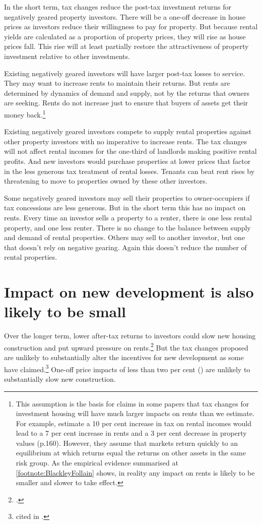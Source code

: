 In the short term, tax changes reduce the post-tax investment returns for negatively geared property investors. There will be a one-off decrease in house prices as investors reduce their willingness to pay for property. But because rental yields are calculated as a proportion of property prices, they will rise as house prices fall. This rise will at least partially restore the attractiveness of property investment relative to other investments. 

Existing negatively geared investors will have larger post-tax losses to service. They may want to increase rents to maintain their returns. But rents are determined by dynamics of demand and supply, not by the returns that owners are seeking. Rents do not increase just to ensure that buyers of assets get their money back.\footnote{This assumption is the basis for claims in some papers that tax changes for investment housing will have much larger impacts on rents than we estimate. For example, \textcite{AbelsonJoyeux2007} estimate a 10 per cent increase in tax on rental incomes would lead to a 7 per cent increase in rents and a 3 per cent decrease in property values (p.160). However, they assume that markets return quickly to an equilibrium at which returns equal the returns on other assets in the same risk group. As the empirical evidence summarised at \cref{footnote:BlackleyFollain} shows, in reality any impact on rents is likely to be smaller and slower to take effect. } 

Existing negatively geared investors compete to supply rental properties against other property investors with no imperative to increase rents. The tax changes will not affect rental incomes for the one-third of landlords making positive rental profits. And new investors would purchase properties at lower prices that factor in the less generous tax treatment of rental losses. Tenants can beat rent rises by threatening to move to properties owned by these other investors. 

Some negatively geared investors may sell their properties to owner-occupiers if tax concessions are less generous. But in the short term this has no impact on rents.  Every time an investor sells a property to a renter, there is one less rental property, and one less renter. There is no change to the balance between supply and demand of rental properties. Others may sell to another investor, but one that doesn’t rely on negative gearing. Again this doesn’t reduce the number of rental properties. 

\section{Impact on new development is also likely to be small}\label{sec:Impact-new-development}
Over the longer term, lower after-tax returns to investors could slow new housing construction and put upward pressure on rents.\footcites{Poterba1984}{AlmFollain1994} But the tax changes proposed are unlikely to substantially alter the incentives for new development as some have claimed.\footnote{\textcite{BISShrapnel2016} cited in \textcite{Daley2016onBIS}.} One-off price impacts of less than two per cent () are unlikely to substantially slow new construction.

